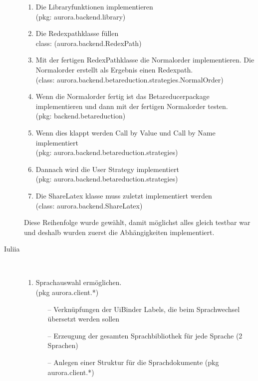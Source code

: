 \documentclass[parskip=full,11pt,twoside]{scrartcl}
\begin{document}
\begin{description}
\begin{enumerate}
    \item  Die Libraryfunktionen implementieren \\(pkg: aurora.backend.library)
    \item Die Redexpathklasse füllen \\class: (aurora.backend.RedexPath)
    \item Mit der fertigen RedexPathklasse die Normalorder implementieren. Die Normalorder erstellt als Ergebnis einen Redexpath. \\(class: aurora.backend.betareduction.strategies.NormalOrder)
    \item Wenn die Normalorder fertig ist das Betareducerpackage implementieren und dann mit der fertigen Normalorder testen. 
    \\ (pkg: backend.betareduction)
    \item Wenn dies klappt werden Call by Value und Call by Name implementiert  \\(pkg: aurora.backend.betareduction.strategies)
\item Dannach wird die User Strategy implementiert \\(pkg: aurora.backend.betareduction.strategies)

\item Die ShareLatex klasse muss zuletzt implementiert werden\\(class: aurora.backend.ShareLatex)
    \end{enumerate}
Diese Reihenfolge wurde gewählt, damit möglichst alles gleich testbar war und deshalb wurden zuerst die Abhängigkeiten implementiert.
    \item [Iuliia]\hfill \\


    \begin{enumerate}
    
    
    \item Sprachauswahl ermöglichen.  \\(pkg aurora.client.*)
    
    \begin{itemize}

	\item[--] Verknüpfungen der UiBinder Labels, die beim Sprachwechsel übersetzt werden sollen
	
	\item[--] Erzeugung der gesamten Sprachbibliothek für jede Sprache (2 Sprachen)
	
	\item[--] Anlegen einer Struktur für die Sprachdokumente (pkg aurora.client.*)


\end{itemize}
\end{enumerate}
\end{description}
\end{document}
